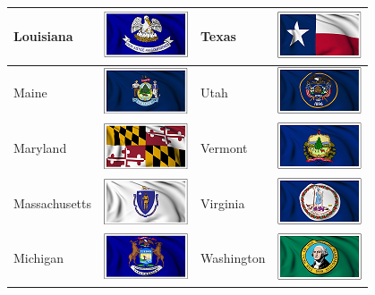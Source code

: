 \documentclass{ximera}
\begin{document}
\begin{center}
\begin{tabular}{|l|l|l|l|}
Louisiana & \includegraphics{pics/StateFlags/Louisiana.png} & Texas & \includegraphics{pics/StateFlags/Texas.png} \\\hline 
Maine & \includegraphics{pics/StateFlags/Maine.png} & Utah & \includegraphics{pics/StateFlags/Utah.png} \\\hline 
Maryland & \includegraphics{pics/StateFlags/Maryland.png} & Vermont & \includegraphics{pics/StateFlags/Vermont.png} \\\hline 
Massachusetts & \includegraphics{pics/StateFlags/Massachusetts.png} & Virginia & \includegraphics{pics/StateFlags/Virginia.png} \\\hline 
Michigan & \includegraphics{pics/StateFlags/Michigan.png} & Washington & \includegraphics{pics/StateFlags/Washington.png} \\\hline 

\end{tabular}
\end{center}
\end{document}
